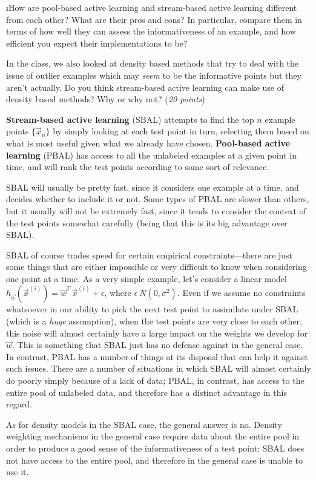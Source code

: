 \documentclass[fleqn]{article}
\begin{document}
\i How are pool-based active learning and stream-based active learning
different from each other? What are their pros and cons? In particular,
compare them in terms of how well they can assess the informativeness of 
an example, and how efficient you expect their implementations to be?

In the class, we also looked at density based methods that try to deal
with the issue of outlier examples which may \emph{seem} to be the informative
points but they aren't actually. Do you think stream-based active learning
can make use of density based methods? Why or why not? (\emph{20 points})

\begin{solution}
\textbf{Stream-based active learning} (SBAL) attempts to find the top $n$ example points $\{ \vec{x}_n \}$ by simply looking at each test point in turn, selecting them based on what is most useful given what we already have chosen. \textbf{Pool-based active learning} (PBAL) has access to all the unlabeled examples at a given point in time, and will rank the test points according to some sort of relevance. \linebreak

SBAL will usually be pretty fast, since it considers one example at a time, and decides whether to include it or not. Some types of PBAL are slower than others, but it usually will not be extremely fast, since it tends to consider the context of the test points somewhat carefully (being that this is its big advantage over SBAL). \linebreak

SBAL of course trades speed for certain empirical constraints---there are just some things that are either impossible or very difficult to know when considering one point at a time. As a very simple example, let's consider a linear model $h_{\vec{w}} (\vec{x}^{(i)}) = \vec{w}^\top \vec{x}^{(i)} + \epsilon$, where $\epsilon ~ N(0, \sigma^2)$. Even if we assume no constraints whatsoever in our ability to pick the next test point to assimilate under SBAL (which is a \textit{huge} assumption), when the test points are very close to each other, this noise will almost certainly have a large impact on the weights we develop for $\vec{w}$. This is something that SBAL just has no defense against in the general case. In contrast, PBAL has a number of things at its disposal that can help it against such issues. There are a number of situations in which SBAL will almost certainly do poorly simply because of a lack of data; PBAL, in contrast, has access to the entire pool of unlabeled data, and therefore has a distinct advantage in this regard. \linebreak

As for density models in the SBAL case, the general answer is no. Density weighting mechanisms in the general case require data about the entire pool in order to produce a good sense of the informativeness of a test point; SBAL does not have access to the entire pool, and therefore in the general case is unable to use it.
\end{solution}
\end{document}

